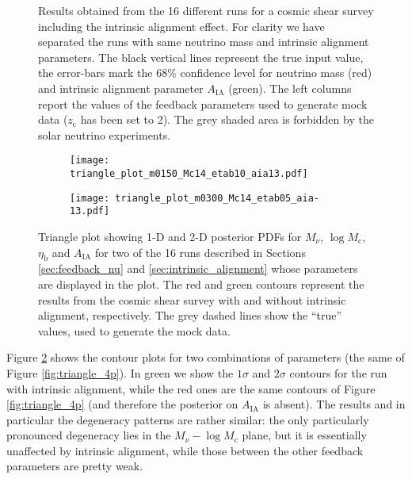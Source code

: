 \documentclass[a4paper,11pt]{article}
\begin{document}
\begin{figure}[!t]
\caption{Results obtained from the 16 different runs for a cosmic shear survey including the intrinsic alignment effect. For clarity we have separated the runs with same neutrino mass and intrinsic alignment parameters.
The black vertical lines represent the true input value, the error-bars mark the 68\% confidence level for neutrino mass (red) and intrinsic alignment parameter $A_\mathrm{IA}$ (green).
The left columns report the values of the feedback parameters used to generate mock data ($z_\mathrm c$ has been set to 2).
The grey shaded area is forbidden by the solar neutrino experiments.}
\label{fig:Mnu_vs_IA_results}
\end{figure}

\begin{figure}[!t]
        \centering
        \begin{subfigure}[b]{0.6\textwidth}
            \centering
            \texttt{[image: triangle\_plot\_m0150\_Mc14\_etab10\_aia13.pdf]}
        \end{subfigure}
        \hspace{-.7\baselineskip}
        \begin{subfigure}[b]{0.6\textwidth}  
            \centering 
            \texttt{[image: triangle\_plot\_m0300\_Mc14\_etab05\_aia-13.pdf]}
        \end{subfigure}
\caption{Triangle plot showing 1-D and 2-D posterior PDFs for $M_\nu$, $\log M_\mathrm c$, $\eta_\mathrm b$ and $A_\mathrm{IA}$ for two of the 16 runs described in Sections \ref{sec:feedback_nu} and \ref{sec:intrinsic_alignment} whose parameters are displayed in the plot.
The red and green contours represent the results from the cosmic shear survey with and without intrinsic alignment, respectively.
The grey dashed lines show the ``true'' values, used to generate the mock data.}
\label{fig:triangle}
\end{figure}

Figure \ref{fig:triangle} shows the contour plots for two combinations of parameters (the same of Figure \ref{fig:triangle_4p}).
In green we show the $1\sigma$ and $2\sigma$ contours for the run with intrinsic alignment, while the red ones are the same contours of Figure \ref{fig:triangle_4p} (and therefore the posterior on $A_\mathrm{IA}$ is absent). The results and in particular the degeneracy patterns are rather similar: 
the only particularly pronounced degeneracy lies in the $M_\nu-\log M_\mathrm c$ plane, but it is essentially unaffected by intrinsic alignment, while those between the other feedback parameters are pretty weak.
\end{document}
